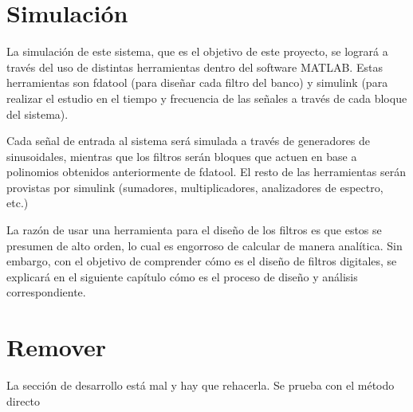 \section{Simulación}
La simulación de este sistema, que es el objetivo de este proyecto, se logrará a través del uso de distintas herramientas dentro del software MATLAB. Estas herramientas son fdatool (para diseñar cada filtro del banco) y simulink (para realizar el estudio en el tiempo y frecuencia de las señales a través de cada bloque del sistema).

Cada señal de entrada al sistema será simulada a través de generadores de sinusoidales, mientras que los filtros serán bloques que actuen en base a polinomios obtenidos anteriormente de fdatool. El resto de las herramientas serán provistas por simulink (sumadores, multiplicadores, analizadores de espectro, etc.)

La razón de usar una herramienta para el diseño de los filtros es que estos se presumen de alto orden, lo cual es engorroso de calcular de manera analítica. Sin embargo, con el objetivo de comprender cómo es el diseño de filtros digitales, se explicará en el siguiente capítulo cómo es el proceso de diseño y análisis correspondiente.

\section{Remover}
La sección de desarrollo está mal y hay que rehacerla.
Se prueba con el método directo \cite{proakis1996digital} \cite{oppenheim1989discrete} \cite{oppenheim1999digital}